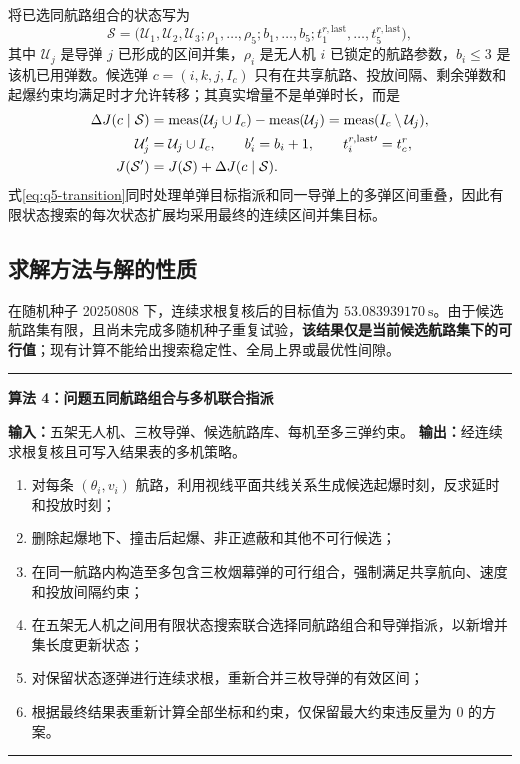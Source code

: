 \documentclass[UTF8,a4paper,12pt,fontset=windows]{ctexart}
\newcommand{\meas}{\operatorname{meas}}
\newenvironment{algobox}[1]
  {\par\medskip\noindent\begin{minipage}{\textwidth}\small\hrule\medskip\textbf{#1}\par\medskip}
  {\medskip\hrule\end{minipage}\par\medskip}
\begin{document}
将已选同航路组合的状态写为
\begin{equation}
\mathcal S=\bigl(\mathcal U_1,\mathcal U_2,\mathcal U_3;
\rho_1,\ldots,\rho_5;
b_1,\ldots,b_5;
t^{r,\mathrm{last}}_1,\ldots,t^{r,\mathrm{last}}_5\bigr),
\label{eq:q5-state}
\end{equation}
其中 $\mathcal U_j$ 是导弹 $j$ 已形成的区间并集，$\rho_i$ 是无人机 $i$ 已锁定的航路参数，$b_i\leq3$ 是该机已用弹数。候选弹 $c=(i,k,j,I_c)$ 只有在共享航路、投放间隔、剩余弹数和起爆约束均满足时才允许转移；其真实增量不是单弹时长，而是
\begin{align}
\Delta J(c\mid\mathcal S)
&=\meas(\mathcal U_j\cup I_c)-\meas(\mathcal U_j)
=\meas(I_c\setminus\mathcal U_j),\label{eq:q5-transition}\\
\mathcal U_j'&=\mathcal U_j\cup I_c,\qquad
b_i'=b_i+1,\qquad t_i^{r,\mathrm{last}\prime}=t_c^r,\notag\\
J(\mathcal S')&=J(\mathcal S)+\Delta J(c\mid\mathcal S).
\end{align}
式\eqref{eq:q5-transition}同时处理单弹目标指派和同一导弹上的多弹区间重叠，因此有限状态搜索的每次状态扩展均采用最终的连续区间并集目标。

\subsection{求解方法与解的性质}

在随机种子 20250808 下，连续求根复核后的目标值为 $\bm{53.083939170\ \mathrm{s}}$。由于候选航路集有限，且尚未完成多随机种子重复试验，\textbf{该结果仅是当前候选航路集下的可行值}；现有计算不能给出搜索稳定性、全局上界或最优性间隙。

\begin{algobox}{算法 4：问题五同航路组合与多机联合指派}
\textbf{输入：}五架无人机、三枚导弹、候选航路库、每机至多三弹约束。\quad
\textbf{输出：}经连续求根复核且可写入结果表的多机策略。
\begin{enumerate}[label=\arabic*.,leftmargin=2em]
  \item 对每条 $(\theta_i,v_i)$ 航路，利用视线平面共线关系生成候选起爆时刻，反求延时和投放时刻；
  \item 删除起爆地下、撞击后起爆、非正遮蔽和其他不可行候选；
  \item 在同一航路内构造至多包含三枚烟幕弹的可行组合，强制满足共享航向、速度和投放间隔约束；
  \item 在五架无人机之间用有限状态搜索联合选择同航路组合和导弹指派，以新增并集长度更新状态；
  \item 对保留状态逐弹进行连续求根，重新合并三枚导弹的有效区间；
  \item 根据最终结果表重新计算全部坐标和约束，仅保留最大约束违反量为 0 的方案。
\end{enumerate}
\end{algobox}
\end{document}
